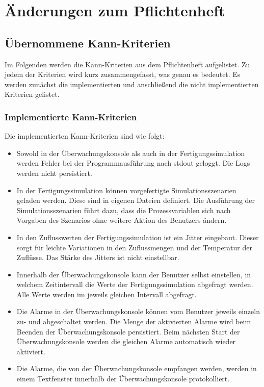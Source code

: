 \documentclass[parskip=full]{scrartcl}
\begin{document}
\pagebreak
\section{Änderungen zum Pflichtenheft}

\subsection{\"Ubernommene Kann-Kriterien}
Im Folgenden werden die Kann-Kriterien aus dem Pflichtenheft aufgelistet. Zu jedem der Kriterien wird
kurz zusammengefasst, was genau es bedeutet. Es werden zunächst die implementierten und anschlie{\ss}end die nicht implementierten
Kriterien gelistet.

\subsubsection{Implementierte Kann-Kriterien}
Die implementierten Kann-Kriterien sind wie folgt:

\begin{itemize}
    \item Sowohl in der \"Uberwachungskonsole als auch in der Fertigungssimulation werden Fehler bei der Programmausf\"uhrung
    nach stdout geloggt. Die Logs werden nicht persistiert.
    \item In der Fertigungssimulation k\"onnen vorgefertigte Simulationsszenarien geladen werden. Diese sind in eigenen Dateien definiert.
    Die Ausführung der Simulationsszenarien f\"uhrt dazu, dass die Prozessvariablen sich nach Vorgaben des Szenarios ohne
    weitere Aktion des Benutzers \"andern.
    \item In den Zuflusswerten der Fertigungssimulation ist ein Jitter eingebaut. Dieser sorgt f\"ur leichte Variationen in den
    Zuflussmengen und der Temperatur der Zufl\"usse. Das Stärke des Jitters ist nicht einstellbar.
    \item Innerhalb der \"Uberwachungskonsole kann der Benutzer selbst einstellen, in welchem Zeitintervall die Werte der
    Fertigungssimulation abgefragt werden. Alle Werte werden im jeweils gleichen Intervall abgefragt.
    \item Die Alarme in der \"Uberwachungskonsole k\"onnen vom Benutzer jeweils einzeln zu- und abgeschaltet werden. Die Menge der
    aktivierten Alarme wird beim Beenden der \"Uberwachungskonsole persistiert. Beim n\"achsten Start der \"Uberwachungskonsole
    werden die gleichen Alarme automatisch wieder aktiviert.
    \item Die Alarme, die von der \"Uberwachungskonsole empfangen werden, werden in einem Textfenster innerhalb der
    \"Uberwachungskonsole protokolliert.
\end{itemize}
\end{document}
